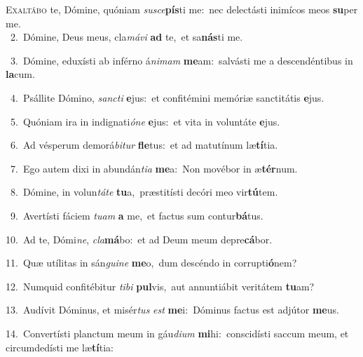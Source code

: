 \lettrine{\initial\textcolor{\initialcolor}{E}}{xaltábo} te, Dómine, quóniam \textit{su}\-\textit{sce}\textbf{pís}ti me:~\star nec delectásti inimícos meos \textbf{su}\-per me.\\
{\numbfont\textcolor{\numbcolor}{~2.}}~Dómine, Deus meus, cla\-\textit{má}\-\textit{vi} \textbf{ad} te,~\star et sa\-\textbf{nás}\-ti me.\par
{\numbfont\textcolor{\numbcolor}{~3.}}~Dómine, eduxísti ab inférno á\-\textit{ni}\-\textit{mam} \textbf{me}\-am:~\star salvásti me a descendéntibus in \textbf{la}\-cum.\par
{\numbfont\textcolor{\numbcolor}{~4.}}~Psállite Dómino, \textit{sanc}\-\textit{ti} \textbf{e}\-jus:~\star et confitémini memóriæ sanctitátis \textbf{e}\-jus.\par
{\numbfont\textcolor{\numbcolor}{~5.}}~Quóniam ira in indignati\-\textit{ó}\-\textit{ne} \textbf{e}\-jus:~\star et vita in voluntáte \textbf{e}\-jus.\par
{\numbfont\textcolor{\numbcolor}{~6.}}~Ad vésperum demorá\-\textit{bi}\-\textit{tur} \textbf{fle}\-tus:~\star et ad matutínum læ\-\textbf{tí}\-tia.\par
{\numbfont\textcolor{\numbcolor}{~7.}}~Ego autem dixi in abundán\-\textit{ti}\-\textit{a} \textbf{me}\-a:~\star Non movébor in æ\-\textbf{tér}\-num.\par
{\numbfont\textcolor{\numbcolor}{~8.}}~Dómine, in volun\-\textit{tá}\-\textit{te} \textbf{tu}\-a,~\star præstitísti decóri meo vir\-\textbf{tú}\-tem.\par
{\numbfont\textcolor{\numbcolor}{~9.}}~Avertísti fáciem \textit{tu}\-\textit{am} \textbf{a} me,~\star et factus sum contur\-\textbf{bá}\-tus.\par
{\numbfont\textcolor{\numbcolor}{10.}}~Ad te, Dómi\-\textit{ne}\-, \textit{cla}\-\textbf{má}bo:~\star et ad Deum meum depre\-\textbf{cá}\-bor.\par
{\numbfont\textcolor{\numbcolor}{11.}}~Quæ utílitas in sán\-\textit{gui}\-\textit{ne} \textbf{me}\-o,~\star dum descéndo in corrupti\-\textbf{ó}\-nem?\par
{\numbfont\textcolor{\numbcolor}{12.}}~Numquid confitébitur \textit{ti}\-\textit{bi} \textbf{pul}\-vis,~\star aut annuntiábit veritátem \textbf{tu}\-am?\par
{\numbfont\textcolor{\numbcolor}{13.}}~Audívit Dóminus, et misér\textit{tus} \textit{est} \textbf{me}\-i:~\star Dóminus factus est adjútor \textbf{me}\-us.\par
{\numbfont\textcolor{\numbcolor}{14.}}~Convertísti planctum meum in gáu\-\textit{di}\-\textit{um} \textbf{mi}\-hi:~\star conscidísti saccum meum, et circumdedísti me læ\-\textbf{tí}\-tia:\par

